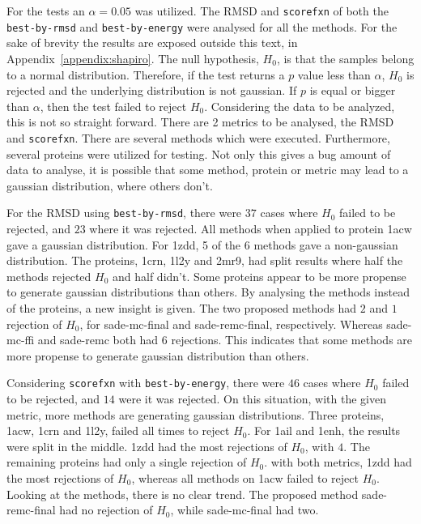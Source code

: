 For the tests an $\alpha = 0.05$ was utilized. The RMSD and \texttt{scorefxn}
of both the \texttt{best-by-rmsd} and \texttt{best-by-energy} were analysed for
all the methods. For the sake of brevity the results are exposed outside this
text, in Appendix~\ref{appendix:shapiro}. The null hypothesis, $H_0$, is that
the samples belong to a normal distribution. Therefore, if the test returns a $p$
value less than $\alpha$, $H_0$ is rejected and the underlying distribution is
not gaussian. If $p$ is equal or bigger than $\alpha$, then the test failed to
reject $H_0$. Considering the data to be analyzed, this is not so straight
forward. There are 2 metrics to be analysed, the RMSD and \texttt{scorefxn}.
There are several methods which were executed. Furthermore, several proteins
were utilized for testing. Not only this gives a bug amount of data to analyse,
it is possible that some method, protein or metric may lead to a gaussian
distribution, where others don't.

For the RMSD using \texttt{best-by-rmsd}, there were $37$ cases where $H_0$
failed to be rejected, and $23$ where it was rejected. All methods when applied
to protein 1acw gave a gaussian distribution. For 1zdd, 5 of the 6 methods gave
a non-gaussian distribution. The proteins, 1crn, 1l2y and 2mr9, had split results
where half the methods rejected $H_0$ and half didn't. Some proteins appear to
be more propense to generate gaussian distributions than others. By analysing
the methods instead of the proteins, a new insight is given. The two proposed
methods had $2$ and $1$ rejection of $H_0$, for sade-mc-final and sade-remc-final,
respectively. Whereas sade-mc-ffi and sade-remc both had $6$ rejections. This
indicates that some methods are more propense to generate gaussian distribution
than others.

Considering \texttt{scorefxn} with \texttt{best-by-energy}, there were $46$
cases where $H_0$ failed to be rejected, and $14$ were it was rejected. On this
situation, with the given metric, more methods are generating gaussian
distributions. Three proteins, 1acw, 1crn and 1l2y, failed all times to reject $H_0$.
For 1ail and 1enh, the results were split in the middle. 1zdd had the most
rejections of $H_0$, with $4$. The remaining proteins had only a single
rejection of $H_0$. with both metrics, 1zdd had the most rejections of $H_0$,
whereas all methods on 1acw failed to reject $H_0$. Looking at the methods,
there is no clear trend. The proposed method sade-remc-final had no rejection
of $H_0$, while sade-mc-final had two.

